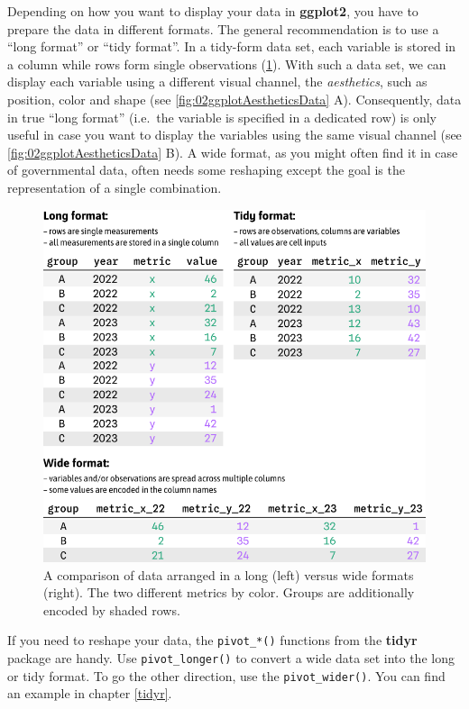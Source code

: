 \documentclass[
]{krantz}
\begin{document}
Depending on how you want to display your data in \textbf{ggplot2}, you have to prepare the data in different formats. The general recommendation is to use a ``long format'' or ``tidy format''. In a tidy-form data set, each variable is stored in a column while rows form single observations (\ref{fig:02imgFormatLongTidyWide}). With such a data set, we can display each variable using a different visual channel, the \emph{aesthetics}, such as position, color and shape (see \ref{fig:02ggplotAestheticsData} A). Consequently, data in true ``long format'' (i.e.~the variable is specified in a dedicated row) is only useful in case you want to display the variables using the same visual channel (see \ref{fig:02ggplotAestheticsData} B). A wide format, as you might often find it in case of governmental data, often needs some reshaping except the goal is the representation of a single combination.

\begin{figure}
\centering
\includegraphics{./img/table-format-long-tidy-wide.png}
\caption{\label{fig:02imgFormatLongTidyWide}A comparison of data arranged in a long (left) versus wide formats (right). The two different metrics by color. Groups are additionally encoded by shaded rows.}
\end{figure}

If you need to reshape your data, the \texttt{pivot\_*()} functions from the \textbf{tidyr} package are handy. Use \texttt{pivot\_longer()} to convert a wide data set into the long or tidy format. To go the other direction, use the \texttt{pivot\_wider()}. You can find an example in chapter \ref{tidyr}.
\end{document}
